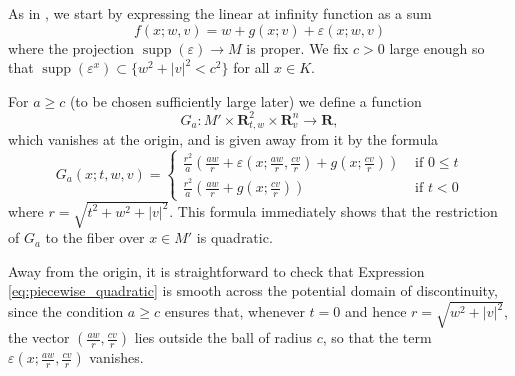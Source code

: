 \documentclass[reqno]{amsart}
\renewcommand{\epsilon}{\varepsilon}
\theoremstyle{theorem}
\theoremstyle{remark}
\theoremstyle{definition}
\DeclareMathOperator{\supp}{supp}
\newcommand{\R}{\mathbf{R}}
\begin{document}
As in \cite{ACGK}, we start by expressing the linear at infinity function as a sum
\[f(x;w,v)=w+g(x;v)+\epsilon(x;w,v)\]
where the projection $\supp(\epsilon)\to M$ is proper. 
We fix $c>0$ large enough so that $\supp(\epsilon^x)\subset \{w^2+|v|^2< c^2\}$ for all $x\in K$.


For $a\geq c$ (to be chosen sufficiently large later) we define a function 
$$G_a:M' \times \R^2_{t,w}\times \R_{v}^n\to \R,$$
 which vanishes at the origin, and is given away from it by the formula
\begin{equation} \label{eq:piecewise_quadratic}
    G_a(x;t,w,v)=\begin{cases}
\frac{r^2}{a}\left(\frac{aw}{r}+\epsilon\left(x;\frac{aw}{r},\frac{cv}{r}\right) + g\left(x;\frac{cv}{r}\right)\right)  & \text{ if } 0 \leq t \\
 \frac{r^2}{a}\left(\frac{aw}{r} + g\left(x;\frac{cv}{r}\right)\right)  &\text{ if } t <  0\end{cases}
\end{equation}
where $r=\sqrt{t^2+w^2+|v|^2}$. This formula immediately shows that the restriction of $G_a$ to the fiber over $x \in M'$ is quadratic.


Away from the origin, it is straightforward to check that Expression \eqref{eq:piecewise_quadratic} is smooth across the potential domain of discontinuity, since the condition $a \geq c$ ensures that, whenever $t=0$ and hence $r=\sqrt{w^2+|v|^2} $, the  vector $(\frac{aw}{r},\frac{cv}{r})$ lies outside the ball of radius $c$, so that the term $\epsilon\left(x;\frac{aw}{r},\frac{cv}{r}\right)$ vanishes.
\end{document}
